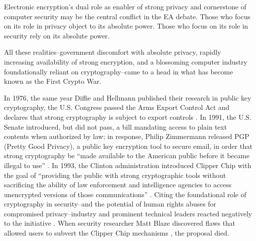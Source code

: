 


Electronic encryption's dual role as enabler of strong privacy and cornerstone of computer security may be the central
conflict in the EA debate. Those who focus on its role in privacy object to its absolute power. Those
who focus on its role in security rely on its absolute power.


All these realities--government discomfort with absolute privacy, rapidly increasing availability of strong encryption,
and a blossoming computer industry foundationally reliant on cryptography--came to a head in what has become known as
the First Crypto War.

In 1976, the same year Diffie and Hellmann published their research in public key cryptography, the U.S. Congress passed
the Arms Export Control Act and declares that strong cryptography is subject to export controls \cite{kehl_right_2015}.
In 1991, the U.S. Senate introduced, but did not pass, a bill mandating access to plain text contents when authorized by
law; in response, Philip Zimmermann released PGP (Pretty Good Privacy), a public key encryption tool to secure email, in
order that strong cryptography be ``made available to the American public before it became illegal to use''
\cite{zimmermann_1996}. In 1993, the Clinton administration introduced Clipper Chip \cite{press_1993} with the goal of
``providing the public with strong cryptographic tools without sacrificing the ability of law enforcement and
intelligence agencies to access unencrypted versions of those communications'' \cite{thompson_2015}. Citing the
foundational role of cryptography in security--and the potential of human rights abuses for compromised
privacy--industry and prominent technical leaders reacted negatively to the initiative \cite{kehl_right_2015}
\cite{zimmermann_1996}. When security researcher Matt Blaze discovered flaws that allowed users to subvert the Clipper
Chip mechanisms \cite{blaze_protocol_1994}, the proposal died.

